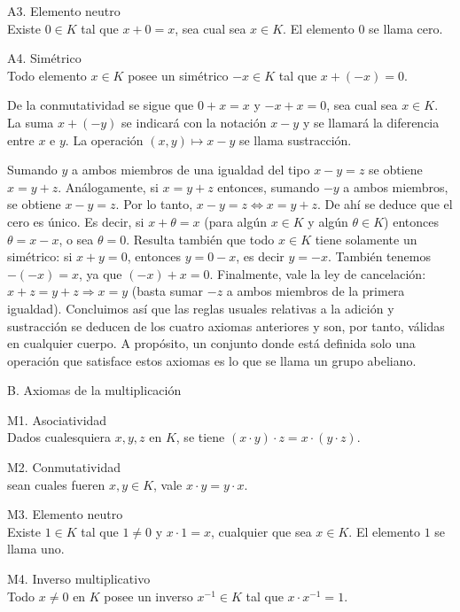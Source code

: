 \documentclass[12pt,oneside]{book}
\begin{document}
A3. Elemento neutro\\
Existe \(0 \in K\) tal que \(x + 0 = x\), sea cual sea \(x \in K\). El elemento \(0\) se llama cero.

A4. Simétrico\\
Todo elemento \(x \in K\) posee un simétrico \(-x \in K\) tal que \(x + (-x) = 0\).

De la conmutatividad se sigue que \(0 + x = x\) y \(-x + x = 0\), sea cual sea \(x \in K\). La suma \(x + (-y)\) se indicará con la notación \(x - y\) y se llamará la diferencia entre \(x\) e \(y\). La operación \((x, y) \mapsto x - y\) se llama sustracción.

Sumando \(y\) a ambos miembros de una igualdad del tipo \(x - y = z\) se obtiene \(x = y + z\). Análogamente, si \(x = y + z\) entonces, sumando \(-y\) a ambos miembros, se obtiene \(x - y = z\). Por lo tanto, \(x - y = z \Leftrightarrow x = y + z\). De ahí se deduce que el cero es único. Es decir, si \(x + \theta = x\) (para algún \(x \in K\) y algún \(\theta \in K\)) entonces \(\theta = x - x\), o sea \(\theta = 0\). Resulta también que todo \(x \in K\) tiene solamente un simétrico: si \(x + y = 0\), entonces \(y = 0 - x\), es decir \(y = -x\). También tenemos \(-(-x) = x\), ya que \((-x) + x = 0\). Finalmente, vale la ley de cancelación: \(x + z = y + z \Rightarrow x = y\) (basta sumar \(-z\) a ambos miembros de la primera igualdad). Concluimos así que las reglas usuales relativas a la adición y sustracción se deducen de los cuatro axiomas anteriores y son, por tanto, válidas en cualquier cuerpo. A propósito, un conjunto donde está definida solo una operación que satisface estos axiomas es lo que se llama un grupo abeliano.

B. Axiomas de la multiplicación

M1. Asociatividad\\
Dados cualesquiera \(x, y, z\) en \(K\), se tiene \((x \cdot y) \cdot z = x \cdot (y \cdot z)\).

M2. Conmutatividad\\
sean cuales fueren \(x, y \in K\), vale \(x \cdot y = y \cdot x\).

M3. Elemento neutro\\
Existe \(1 \in K\) tal que \(1 \neq 0\) y \(x \cdot 1 = x\), cualquier que sea \(x \in K\). El elemento \(1\) se llama uno.

M4. Inverso multiplicativo\\
Todo \(x \neq 0\) en \(K\) posee un inverso \(x^{-1} \in K\) tal que \(x \cdot x^{-1} = 1\).
\end{document}
